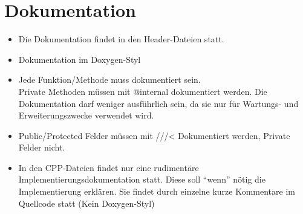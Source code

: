 \section{Dokumentation}
\begin{itemize}[leftmargin=*]
    \item Die Dokumentation findet in den Header-Dateien statt.
    \item Dokumentation im Doxygen-Styl
    \item Jede Funktion/Methode muss dokumentiert sein.\\ 
          Private Methoden müssen mit @internal dokumentiert werden. Die Dokumentation darf weniger ausführlich sein, da sie nur für Wartungs- und Erweiterungszwecke verwendet wird.
    \item Public/Protected Felder müssen mit ///\textless{} Dokumentiert werden, Private Felder nicht.
    \item In den CPP-Dateien findet nur eine rudimentäre Implementierungsdokumentation statt. Diese soll “wenn” nötig die Implementierung erklären. Sie findet durch einzelne kurze Kommentare im Quellcode statt (Kein Doxygen-Styl)
\end{itemize}
